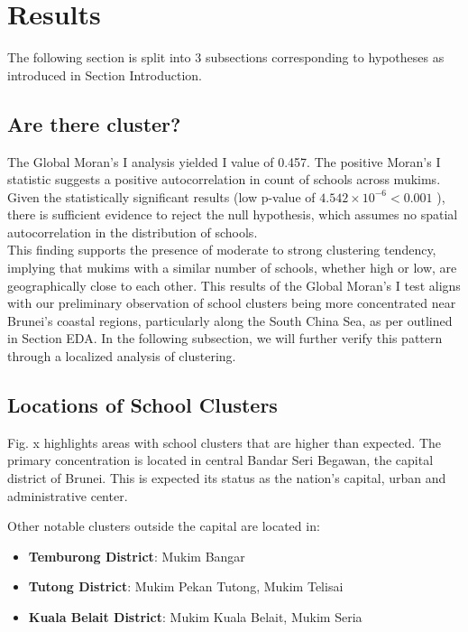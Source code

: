 \documentclass[12pt]{article}
\begin{document}
\section{Results}
The following section is split into 3 subsections corresponding to hypotheses as introduced in Section Introduction.

\subsection{Are there cluster?}
The Global Moran's I analysis yielded I value of 0.457. The positive Moran’s I statistic suggests a positive autocorrelation in count of schools across mukims. Given the statistically significant results (low p-value of $4.542 \times 10^{-6} < 0.001$ ), there is sufficient evidence to reject the null hypothesis, which assumes no spatial autocorrelation in the distribution of schools. \\

This finding supports the presence of moderate to strong clustering tendency, implying that mukims with a similar number of schools, whether high or low, are geographically close to each other. This results of the Global Moran’s I test aligns with our preliminary observation of school clusters being more concentrated near Brunei’s coastal regions, particularly along the South China Sea, as per outlined in Section EDA. In the following subsection, we will further verify this pattern through a localized analysis of clustering. \\

\subsection{Locations of School Clusters}
Fig. x highlights areas with school clusters that are higher than expected. The primary concentration is located in central Bandar Seri Begawan, the capital district of Brunei. This is expected its status as the nation’s capital, urban and administrative center.

Other notable clusters outside the capital are located in:
\begin{itemize}
    \item \textbf{Temburong District}: Mukim Bangar
    \item \textbf{Tutong District}: Mukim Pekan Tutong, Mukim Telisai
    \item \textbf{Kuala Belait District}: Mukim Kuala Belait, Mukim Seria
\end{itemize}
\end{document}

